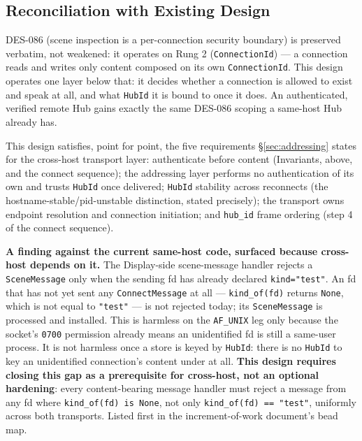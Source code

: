 \documentclass[a4paper,10pt]{article}
\newcommand{\msg}[1]{\texttt{#1}}
\newcommand{\field}[1]{\texttt{#1}}
\begin{document}
\subsection{Reconciliation with Existing Design}

DES-086 (scene inspection is a per-connection security boundary) is
preserved verbatim, not weakened: it operates on Rung 2
(\texttt{ConnectionId}) --- a connection reads and writes only content
composed on its own \texttt{ConnectionId}.  This design operates one layer
below that: it decides whether a connection is allowed to exist and speak
at all, and what \texttt{HubId} it is bound to once it does.  An
authenticated, verified remote Hub gains exactly the same DES-086 scoping
a same-host Hub already has.

This design satisfies, point for point, the five requirements
\S\ref{sec:addressing} states for the cross-host transport layer:
authenticate before content (Invariants, above, and the connect
sequence); the addressing layer performs no authentication of its own and
trusts \texttt{HubId} once delivered; \texttt{HubId} stability across
reconnects (the hostname-stable/pid-unstable distinction, stated
precisely); the transport owns endpoint resolution and connection
initiation; and \field{hub\_id} frame ordering (step 4 of the connect
sequence).

\textbf{A finding against the current same-host code, surfaced because
cross-host depends on it.}  The Display-side scene-message handler rejects a
\msg{SceneMessage} only when the sending fd has already declared
\texttt{kind="test"}.  An fd that has not yet sent any \msg{ConnectMessage}
at all --- \field{kind\_of(fd)} returns \texttt{None}, which is not equal
to \texttt{"test"} --- is not rejected today; its \msg{SceneMessage} is
processed and installed.  This is harmless on the \field{AF\_UNIX} leg
only because the socket's \texttt{0700} permission already means an
unidentified fd is still a same-user process.  It is not harmless once a
store is keyed by \texttt{HubId}: there is no \texttt{HubId} to key an
unidentified connection's content under at all.  \textbf{This design
requires closing this gap as a prerequisite for cross-host, not an
optional hardening}: every content-bearing message handler must reject a
message from any fd where \field{kind\_of(fd) is None}, not only
\field{kind\_of(fd) == "test"}, uniformly across both transports.  Listed
first in the increment-of-work document's bead map.

\end{document}
